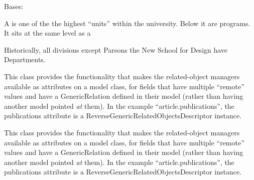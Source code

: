 \documentclass[letterpaper,10pt,english]{sphinxmanual}
\begin{document}

\begin{fulllineitems}
\label{generated/apps.profiles.models:apps.profiles.models.Department}
Bases: {\hyperref[generated/apps.profiles.models:apps.profiles.models.BaseModel]{}}

A  is one of the the highest ``units'' within the university.  
Below it are programs.  It sits at the same level as a 

Historically, all divisions except Parsons the New School for Design 
have Departments.


\begin{fulllineitems}
\label{generated/apps.profiles.models:apps.profiles.models.Department.authorities}
This class provides the functionality that makes the related-object
managers available as attributes on a model class, for fields that have
multiple ``remote'' values and have a GenericRelation defined in their model
(rather than having another model pointed \emph{at} them). In the example
``article.publications'', the publications attribute is a
ReverseGenericRelatedObjectsDescriptor instance.

\end{fulllineitems}



\begin{fulllineitems}
\label{generated/apps.profiles.models:apps.profiles.models.Department.unit_permissions}
This class provides the functionality that makes the related-object
managers available as attributes on a model class, for fields that have
multiple ``remote'' values and have a GenericRelation defined in their model
(rather than having another model pointed \emph{at} them). In the example
``article.publications'', the publications attribute is a
ReverseGenericRelatedObjectsDescriptor instance.

\end{fulllineitems}


\end{fulllineitems}
\end{document}
